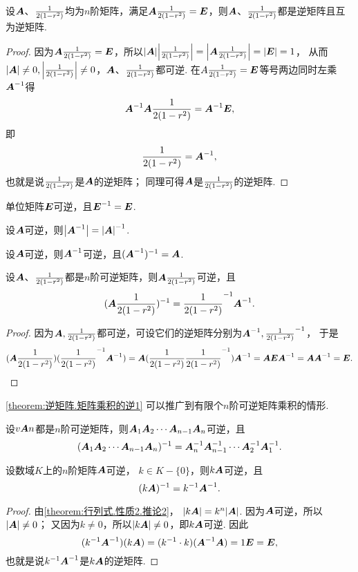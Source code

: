 \begin{property}\label{theorem:逆矩阵.逆矩阵的对称性}
设\(\A\)、\(\B\)均为\(n\)阶矩阵，满足\(\A\B=\E\)，则\(\A\)、\(\B\)都是逆矩阵且互为逆矩阵.
\begin{proof}
因为\(\A\B=\E\)，所以\(\abs{\A}\abs{\B}=\abs{\A\B}=\abs{\E}=1\)，
从而\(\abs{\A}\neq0,\abs{\B}\neq0\)，\(\A\)、\(\B\)都可逆.
在\(A\B=\E\)等号两边同时左乘\(\A^{-1}\)得\[
	\A^{-1}\A\B=\A^{-1}\E,
\]即\[
	\B=\A^{-1},
\]
也就是说\(\B\)是\(\A\)的逆矩阵；
同理可得\(\A\)是\(\B\)的逆矩阵.
\end{proof}
\end{property}

\begin{property}\label{theorem:逆矩阵.单位矩阵可逆}
单位矩阵\(\E\)可逆，且\(\E^{-1}=\E\).
\end{property}

\begin{property}\label{theorem:逆矩阵.逆矩阵的行列式}
设\(\A\)可逆，则\(\abs{\A^{-1}}=\abs{\A}^{-1}\).
\end{property}

\begin{property}\label{theorem:逆矩阵.逆矩阵的逆}
设\(\A\)可逆，则\(\A^{-1}\)可逆，且\((\A^{-1})^{-1}=\A\).
\end{property}

\begin{property}\label{theorem:逆矩阵.矩阵乘积的逆1}
设\(\A\)、\(\B\)都是\(n\)阶可逆矩阵，则\(\A\B\)可逆，且\begin{equation}
(\A \B)^{-1} = \B^{-1} \A^{-1}.
\end{equation}
\begin{proof}
因为\(\A,\B\)都可逆，可设它们的逆矩阵分别为\(\A^{-1},\B^{-1}\)，
于是\[
	(\A\B)(\B^{-1}\A^{-1})
	= \A(\B\B^{-1})\A^{-1}
	= \A\E\A^{-1}
	= \A\A^{-1}
	= \E.
	\qedhere
\]
\end{proof}
\end{property}

\cref{theorem:逆矩阵.矩阵乘积的逆1} 可以推广到有限个\(n\)阶可逆矩阵乘积的情形.
\begin{property}\label{theorem:逆矩阵.矩阵乘积的逆2}
设\(\v{\A}{n}\)都是\(n\)阶可逆矩阵，则\(\A_1 \A_2 \dotsm \A_{n-1} \A_n\)可逆，且\begin{equation}
(\A_1 \A_2 \dotsm \A_{n-1} \A_n)^{-1}
= \A_n^{-1} \A_{n-1}^{-1} \dotsm \A_2^{-1} \A_1^{-1}.
\end{equation}
\end{property}

\begin{property}\label{theorem:逆矩阵.数与矩阵乘积的逆}
设数域\(K\)上的\(n\)阶矩阵\(\A\)可逆，
\(k \in K-\{0\}\)，则\(k\A\)可逆，且
\begin{equation}
	(k\A)^{-1}=k^{-1}\A^{-1}.
\end{equation}
\begin{proof}
由\cref{theorem:行列式.性质2.推论2}，
\(\abs{k\A} = k^n\abs{\A}\).
因为\(\A\)可逆，所以\(\abs{\A}\neq0\)；
又因为\(k\neq0\)，所以\(\abs{k\A}\neq0\)，即\(k\A\)可逆.
因此\[
	(k^{-1}\A^{-1})(k\A)
	= (k^{-1} \cdot k)(\A^{-1}\A)
	= 1 \E = \E,
\]
也就是说\(k^{-1}\A^{-1}\)是\(k\A\)的逆矩阵.
\end{proof}
\end{property}

